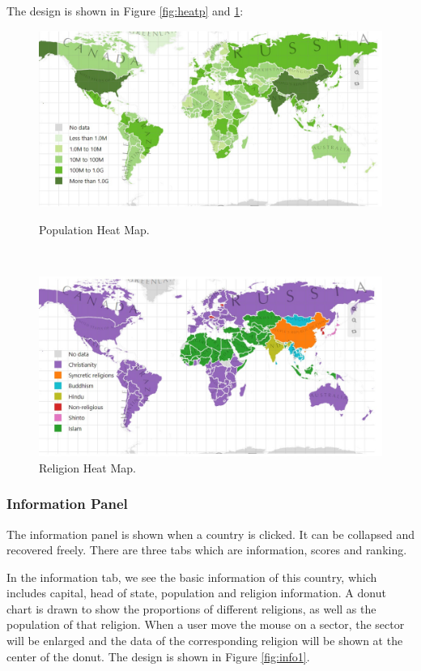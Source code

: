 \documentclass[12pt, fullpage,letterpaper]{article}
\begin{document}
The design is shown in Figure \ref{fig:heatp} and \ref{fig:heatr}:
\begin{figure}[h!]
    \begin{minipage}{0.49\linewidth}
        \centering
        \includegraphics[width=\textwidth]{figs/heatmapp.jpg}
        \caption{Population Heat Map.}
        \label{fig:heatp}
    \end{minipage}
    \hfill\
    \begin{minipage}{0.49\linewidth}
        \centering
        \includegraphics[width=\textwidth]{figs/heatmapr.jpg}
        \caption{Religion Heat Map.}
        \label{fig:heatr}
    \end{minipage}
\end{figure} 

\subsubsection{Information Panel}
The information panel is shown when a country is clicked. It can be collapsed and recovered freely.
There are three tabs which are information, scores and ranking.

In the information tab, we see the basic information of this country, which includes capital, head of state, population and religion information.
A donut chart is drawn to show the proportions of different religions, as well as the population of that religion.
When a user move the mouse on a sector, the sector will be enlarged and the data of the corresponding religion will be shown at the center of the donut.
The design is shown in Figure \ref{fig:info1}.
\end{document}
